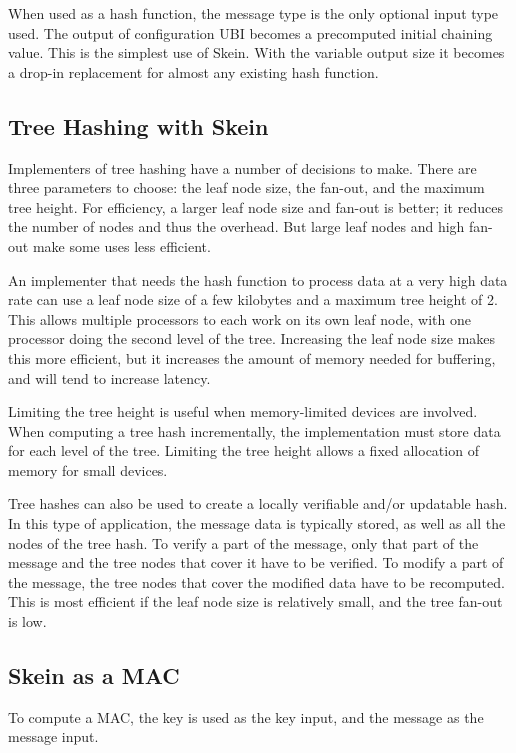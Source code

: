\documentclass[11pt,twoside]{article}
\begin{document}
When used as a hash function, the message type is the only optional input type used. The output of configuration UBI becomes a precomputed initial chaining value.  This is the simplest use of Skein. With the variable output size it becomes a drop-in replacement for almost any existing hash function.

\subsection{Tree Hashing with Skein}

Implementers of tree hashing have a number of decisions to make. There are three parameters to choose: the leaf node size, the fan-out, and the maximum tree height. For efficiency, a larger leaf node size and fan-out is better; it reduces the number of nodes and thus the overhead. But large leaf nodes and high fan-out make some uses less efficient.

An implementer that needs the hash function to process data at a very high data rate can use a leaf node size of a few kilobytes and a maximum tree height of 2. This allows multiple processors to each work on its own leaf node, with one processor doing the second level of the tree. Increasing the leaf node size makes this more efficient, but it increases the amount of memory needed for buffering, and will tend to increase latency.

Limiting the tree height is useful when memory-limited devices are involved. When computing a tree hash incrementally, the implementation must store data for each level of the tree. Limiting the tree height allows a fixed allocation of memory for small devices.

Tree hashes can also be used to create a locally verifiable and/or updatable hash. In this type of application, the message data is typically stored, as well as all the nodes of the tree hash. To verify a part of the message, only that part of the message and the tree nodes that cover it have to be verified. To modify a part of the message, the tree nodes that cover the modified data have to be recomputed. This is most efficient if the leaf node size is relatively small, and the tree fan-out is low.

\subsection{Skein as a MAC}

To compute a MAC, the key is used as the key input, and the message as the message input.
\end{document}
